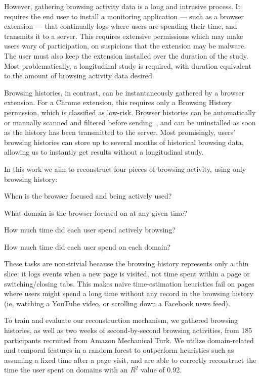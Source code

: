 \documentclass{sigchi}
\begin{document}
However, gathering browsing activity data is a long and intrusive process. It requires the end user to install a monitoring application --- such as a browser extension --- that continually logs where users are spending their time, and transmits it to a server. This requires extensive permissions which may make users wary of participation, on suspicions that the extension may be malware. The user must also keep the extension installed over the duration of the study. %
Most problematically, a longitudinal study is required, with duration equivalent to the amount of browsing activity data desired.

Browsing histories, in contrast, can be instantaneously gathered by a browser extension. For a Chrome extension, this requires only a Browsing History permission, which is classified as low-risk. Browser histories can be automatically or manually scanned and filtered before sending~\cite{eyebrowse}, and can be uninstalled as soon as the history has been transmitted to the server. Most promisingly, users' browsing histories can store up to several months of historical browsing data, allowing us to instantly get results without a longitudinal study.

In this work we aim to reconstruct four pieces of browsing activity, using only browsing history:

\begin{compactitem}
	\item When is the browser focused and being actively used?
	\item What domain is the browser focused on at any given time?
	\item How much time did each user spend actively browsing?
	\item How much time did each user spend on each domain?
\end{compactitem}

These tasks are non-trivial because the browsing history represents only a thin slice: it logs events when a new page is visited, not time spent within a page or switching/closing tabs. This makes naive time-estimation heuristics fail on pages where users might spend a long time without any record in the browsing history (ie, watching a YouTube video, or scrolling down a Facebook news feed).

To train and evaluate our reconstruction mechanism, we gathered browsing histories, as well as two weeks of second-by-second browsing activities, from 185 participants recruited from Amazon Mechanical Turk. We utilize domain-related and temporal features in a random forest to outperform heuristics such as assuming a fixed time after a page visit, and are able to correctly reconstruct the time the user spent on domains with an $R^2$ value of 0.92. %
\end{document}
